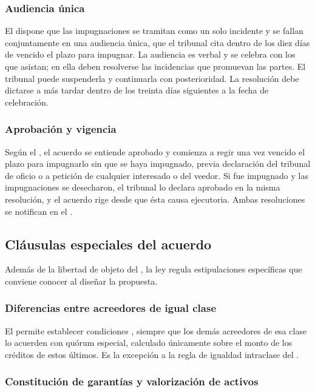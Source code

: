 \subsubsection{Audiencia única}

El  dispone que las impugnaciones se tramitan como un solo incidente y se fallan
conjuntamente en una audiencia única, que el tribunal cita dentro de los diez días de
vencido el plazo para impugnar. La audiencia es verbal y se celebra con los que asistan; en
ella deben resolverse las incidencias que promuevan las partes. El tribunal puede
suspenderla y continuarla con posterioridad. La resolución debe dictarse a más tardar dentro
de los treinta días siguientes a la fecha de celebración.

\subsubsection{Aprobación y vigencia}

Según el , el acuerdo se entiende aprobado y comienza a regir una vez vencido el
plazo para impugnarlo sin que se haya impugnado, previa declaración del tribunal de oficio o
a petición de cualquier interesado o del veedor. Si fue impugnado y las impugnaciones se
desecharon, el tribunal lo declara aprobado en la misma resolución, y el acuerdo rige desde
que ésta causa ejecutoria. Ambas resoluciones se notifican en el \boletin{}.

\subsection{Cláusulas especiales del acuerdo}

Además de la libertad de objeto del , la ley regula estipulaciones específicas que
conviene conocer al diseñar la propuesta.

\subsubsection{Diferencias entre acreedores de igual clase}

El  permite establecer condiciones , siempre que los demás acreedores de esa clase lo acuerden con quórum
especial, calculado únicamente sobre el monto de los créditos de estos últimos. Es la
excepción a la regla de igualdad intraclase del .

\subsubsection{Constitución de garantías y valorización de activos}

